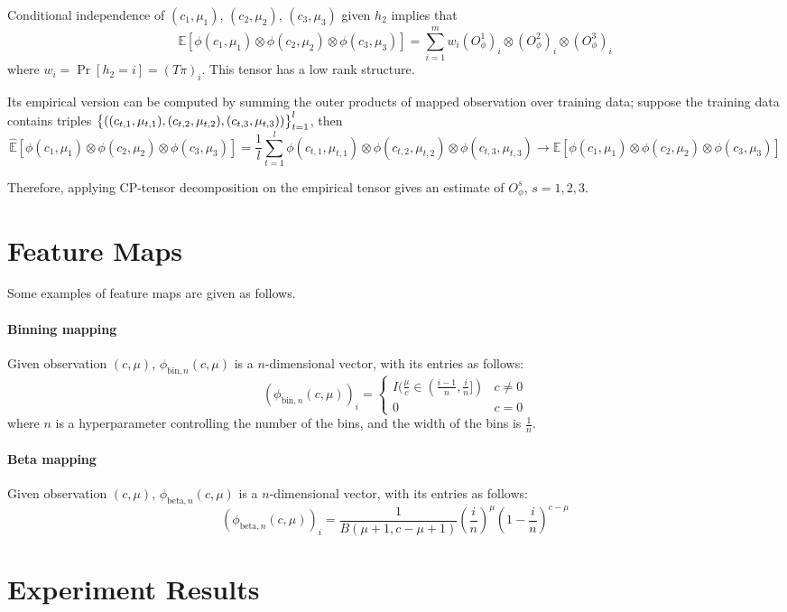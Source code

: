 \documentclass{article}
\def\E{\mathbb{E}}
\def\bin{\text{bin}}
\def\bet{\text{beta}}
\begin{document}
Conditional independence of $(c_1, \mu_1)$, $(c_2, \mu_2)$, $(c_3, \mu_3)$ given $h_2$ implies that
\[ \E[\phi(c_1, \mu_1) \otimes \phi(c_2, \mu_2) \otimes \phi(c_3, \mu_3)] = \sum_{i=1}^m w_i (O_{\phi}^1)_i \otimes (O_{\phi}^2)_i \otimes (O_{\phi}^3)_i \]
where $w_i = \Pr[h_2 = i] = (T\pi)_i$.
This tensor has a low rank structure.

Its empirical version can be computed by summing the outer products of mapped observation over training data; suppose the training data contains triples $\cbr{((c_{t,1}, \mu_{t,1}), (c_{t,2}, \mu_{t,2}), (c_{t,3}, \mu_{t,3}))}_{t=1}^{l}$, then
\[ \hat{\E}[\phi(c_1, \mu_1) \otimes \phi(c_2, \mu_2) \otimes \phi(c_3, \mu_3)] = \frac{1}{l} \sum_{t=1}^l \phi(c_{t,1}, \mu_{t,1}) \otimes \phi(c_{t,2}, \mu_{t,2}) \otimes \phi(c_{t,3}, \mu_{t,3}) \to \E[\phi(c_1, \mu_1) \otimes \phi(c_2, \mu_2) \otimes \phi(c_3, \mu_3)] \]

Therefore, applying CP-tensor decomposition on the empirical tensor gives an estimate of $O_{\phi}^s$, $s = 1,2,3$.


\section{Feature Maps}
Some examples of feature maps are given as follows.

\paragraph{Binning mapping} Given observation $(c, \mu)$, $\phi_{\bin, n}(c, \mu)$ is a $n$-dimensional vector, with its entries as follows:
\[ (\phi_{\bin, n}(c, \mu))_i = \begin{cases} I(\frac{\mu}{c} \in (\frac{i-1}{n}, \frac{i}{n}]) & c \neq 0 \\ 0 & c = 0 \end{cases} \]
where $n$ is a hyperparameter controlling the number of the bins, and the width of the bins is $\frac{1}{n}$.

\paragraph{Beta mapping} Given observation $(c, \mu)$, $\phi_{\bet, n}(c, \mu)$ is a $n$-dimensional vector, with its entries as follows:
\[ (\phi_{\bet, n}(c, \mu))_i = \frac{1}{B(\mu+1, c-\mu+1)} (\frac{i}{n})^\mu (1-\frac{i}{n})^{c-\mu} \]

\section{Experiment Results}
\end{document}
